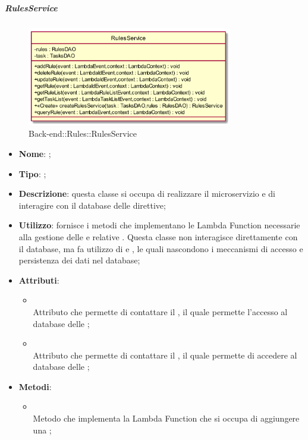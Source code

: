 \hypertarget{RulesService_label}{\subparagraph{RulesService}}
\begin{figure}[h]
	\centering
	\includegraphics[width=0.80\textwidth,height=\textheight,keepaspectratio]{images/ClassRulesService.png}
	\caption{Back-end::Rules::RulesService}
\end{figure}
\begin{itemize}
	\item \textbf{Nome}: ;
	\item \textbf{Tipo}: ;
	\item \textbf{Descrizione}: questa classe si occupa di realizzare il microservizio  e di interagire con il database delle direttive;
	\item \textbf{Utilizzo}: fornisce i metodi che implementano le Lambda Function necessarie alla gestione delle  e relative . Questa classe non interagisce direttamente con il database, ma fa utilizzo di  e , le quali nascondono i meccanismi di accesso e persistenza dei dati nel database;
	\item \textbf{Attributi}:
	\begin{itemize}
		\item[]  \\
		Attributo che permette di contattare il , il quale permette l'accesso al database delle ;
		\item[]  \\
		Attributo che permette di contattare il , il quale permette di accedere al database delle ;
	\end{itemize}
	\item \textbf{Metodi}:
	\begin{itemize}
		\item[]  \\		Metodo che implementa la Lambda Function che si occupa di aggiungere una ;\\

\end{itemize}
\end{itemize}
